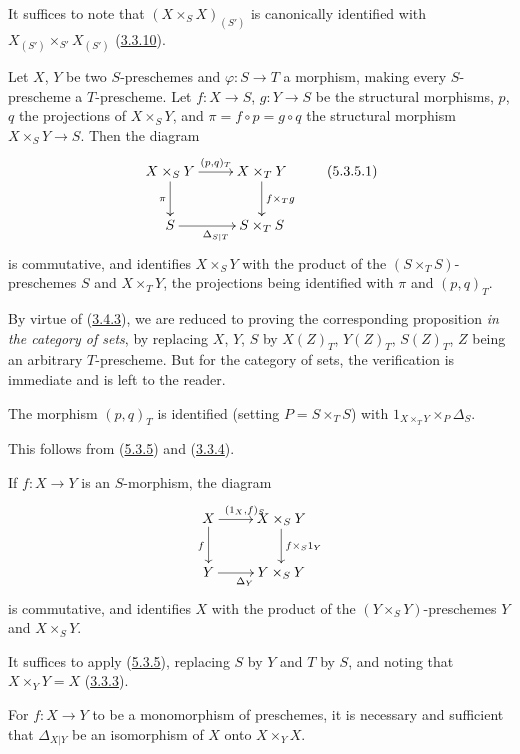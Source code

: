 It suffices to note that $(X\times_S X)_{(S')}$ is canonically identified with
$X_{(S')}\times_{S'}X_{(S')}$
(\hyperref[I.3.3.10]{3.3.10}).

\begin{proposition}[5.3.5]
\label{I.5.3.5}
Let $X$, $Y$ be two $S$-preschemes and $\varphi:S\to T$ a morphism, making
every $S$-prescheme a $T$-prescheme. Let $f:X\to S$, $g:Y\to S$ be the
structural morphisms, $p$, $q$ the projections of $X\times_S Y$, and
$\pi=f\circ p=g\circ q$ the structural morphism $X\times_S Y\to S$. Then the
diagram
\[
  \xymatrix{
    X\times_S Y\ar[r]^{(p,q)_T}\ar[d]_\pi &
    X\times_T Y\ar[d]^{f\times_T g}\\
    S\ar[r]_{\Delta_{S|T}} &
    S\times_T S
  }
  \tag{5.3.5.1}\label{I.5.3.5.1}
\]
is commutative, and identifies $X\times_S Y$ with the product of the
$(S\times_T S)$-preschemes $S$ and $X\times_T Y$, the projections
being identified with $\pi$ and $(p,q)_T$.
\end{proposition}

By virtue of (\hyperref[I.3.4.3]{3.4.3}), we are reduced to proving the
corresponding proposition \emph{in the category of sets}, by
replacing $X$, $Y$, $S$ by $X(Z)_T$, $Y(Z)_T$, $S(Z)_T$, $Z$ being an
arbitrary $T$-prescheme. But for the category of sets, the verification
is immediate and is left to the reader.

\begin{corollary}[5.3.6]
\label{I.5.3.6}
The morphism $(p,q)_T$ is identified (setting $P=S\times_T S$) with
$1_{X\times_T Y}\times_P\Delta_S$.
\end{corollary}

This follows from (\hyperref[I.5.3.5]{5.3.5}) and
(\hyperref[I.3.3.4]{3.3.4}).

\begin{corollary}[5.3.7]
\label{I.5.3.7}
If $f:X\to Y$ is an $S$-morphism, the diagram
\[
  \xymatrix{
    X\ar[r]^{(1_X,f)_S}\ar[d]_f &
    X\times_S Y\ar[d]^{f\times_S 1_Y}\\
    Y\ar[r]_{\Delta_Y} &
    Y\times_S Y
  }
\]
is commutative, and identifies $X$ with the product of the
$(Y\times_S Y)$-preschemes $Y$ and $X\times_S Y$.
\end{corollary}

It suffices to apply (\hyperref[I.5.3.5]{5.3.5}), replacing $S$ by
$Y$ and $T$ by $S$, and noting that $X\times_Y Y=X$
(\hyperref[I.3.3.3]{3.3.3}).

\begin{proposition}[5.3.8]
\label{I.5.3.8}
For $f:X\to Y$ to be a monomorphism of preschemes, it is necessary and
sufficient that $\Delta_{X|Y}$ be an isomorphism of $X$ onto $X\times_Y X$.
\end{proposition}

